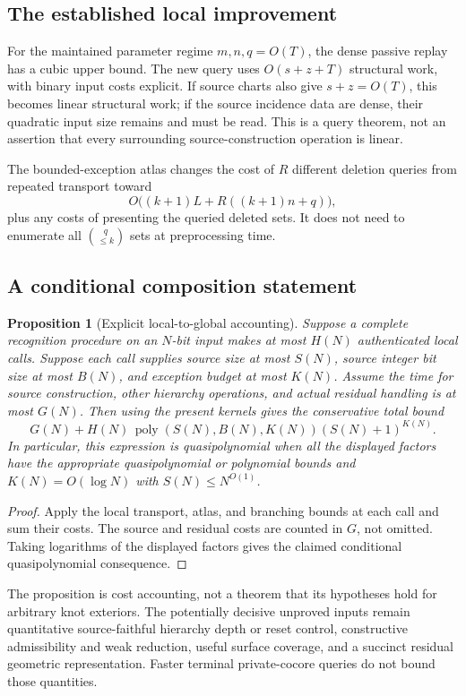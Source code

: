 \documentclass[11pt,letterpaper]{article}
\newtheorem{proposition}[theorem]{Proposition}
\theoremstyle{definition}
\newcommand{\poly}{\operatorname{poly}}
\begin{document}
\subsection{The established local improvement}
For the maintained parameter regime $m,n,q=O(T)$, the dense passive replay has a cubic upper bound. The new query uses $O(s+z+T)$ structural work, with binary input costs explicit. If source charts also give $s+z=O(T)$, this becomes linear structural work; if the source incidence data are dense, their quadratic input size remains and must be read. This is a query theorem, not an assertion that every surrounding source-construction operation is linear.

The bounded-exception atlas changes the cost of $R$ different deletion queries from repeated transport toward
\[
 O\bigl((k+1)L+R((k+1)n+q)\bigr),
\]
plus any costs of presenting the queried deleted sets. It does not need to enumerate all $\binom{q}{\le k}$ sets at preprocessing time.

\subsection{A conditional composition statement}
\begin{proposition}[Explicit local-to-global accounting]\label{prop:composition}
Suppose a complete recognition procedure on an $N$-bit input makes at most $H(N)$ authenticated local calls. Suppose each call supplies source size at most $S(N)$, source integer bit size at most $B(N)$, and exception budget at most $K(N)$. Assume the time for source construction, other hierarchy operations, and actual residual handling is at most $G(N)$. Then using the present kernels gives the conservative total bound
\[
 G(N)+H(N)\,\poly(S(N),B(N),K(N))
                  (S(N)+1)^{K(N)}.
\]
In particular, this expression is quasipolynomial when all the displayed factors have the appropriate quasipolynomial or polynomial bounds and $K(N)=O(\log N)$ with $S(N)\le N^{O(1)}$.
\end{proposition}
\begin{proof}
Apply the local transport, atlas, and branching bounds at each call and sum their costs. The source and residual costs are counted in $G$, not omitted. Taking logarithms of the displayed factors gives the claimed conditional quasipolynomial consequence.
\end{proof}

The proposition is cost accounting, not a theorem that its hypotheses hold for arbitrary knot exteriors. The potentially decisive unproved inputs remain quantitative source-faithful hierarchy depth or reset control, constructive admissibility and weak reduction, useful surface coverage, and a succinct residual geometric representation. Faster terminal private-cocore queries do not bound those quantities.
\end{document}
